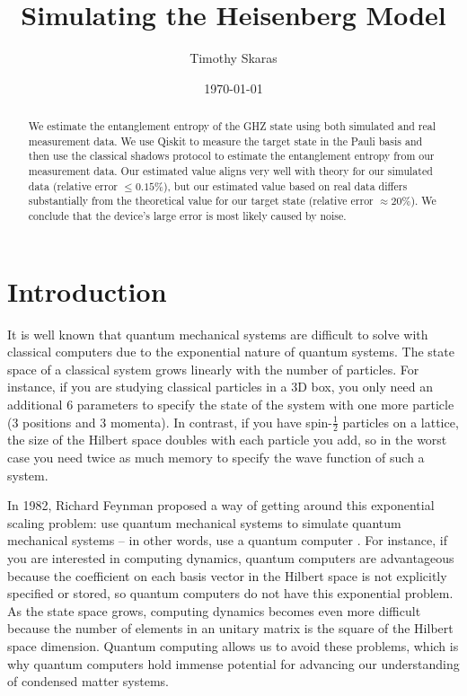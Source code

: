 \documentclass[aps,prl, reprint]{revtex4-2}
\begin{document}
\title{Simulating the Heisenberg Model}
\date{\today}
\author{Timothy Skaras}
\begin{abstract}
We estimate the entanglement entropy of the GHZ state using both simulated and real measurement data. We use Qiskit to measure the target state in the Pauli basis and then use the classical shadows protocol to estimate the entanglement entropy from our measurement data. Our estimated value aligns very well with theory for our simulated data (relative error $\leq 0.15\%$), but our estimated value based on real data differs substantially from the theoretical value for our target state (relative error $\approx 20\%$). We conclude that the device's large error is most likely caused by noise.
\end{abstract}

\maketitle

\section{Introduction}

It is well known that quantum mechanical systems are difficult to solve with classical computers due to the exponential nature of quantum systems. The state space of a classical system grows linearly with the number of particles. For instance, if you are studying classical particles in a 3D box, you only need an additional 6 parameters to specify the state of the system with one more particle (3 positions and 3 momenta). In contrast, if you have spin-$\frac{1}{2}$ particles on a lattice, the size of the Hilbert space doubles with each particle you add, so in the worst case you need twice as much memory to specify the wave function of such a system. 

In 1982, Richard Feynman proposed a way of getting around this exponential scaling problem: use quantum mechanical systems to simulate quantum mechanical systems -- in other words, use a quantum computer \cite{feynman1982simulating}. For instance, if you are interested in computing dynamics, quantum computers are advantageous because the coefficient on each basis vector in the Hilbert space is not explicitly specified or stored, so quantum computers do not have this exponential problem. As the state space grows, computing dynamics becomes even more difficult because the number of elements in an unitary matrix is the square of the Hilbert space dimension. Quantum computing allows us to avoid these problems, which is why quantum computers hold immense potential for advancing our understanding of condensed matter systems.
\end{document}
